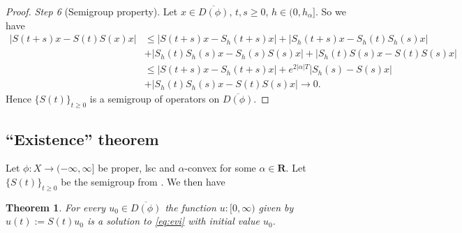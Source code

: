 \documentclass[a4paper,11pt, leqno]{scrreprt} %
\renewcommand{\leq}{\leqslant}
\renewcommand{\leq}{\leqslant}
\renewcommand{\geq}{\geqslant}
\newcommand{\R}{\mathbf R}
\theoremstyle{change}
\newcounter{acounter}[chapter]
\newtheorem{theorem}[acounter]{Theorem}
\theoremstyle{nonumberplain}
\newtheorem{proof}{Proof}
\begin{document}
\begin{proof}
  \textit{Step 6} (Semigroup property).
  Let $x \in \overline{D(\phi)}$, $t, s \geq 0$, $h \in (0,
  h_\alpha]$. So we have
  \begin{equation*}
    \begin{split}
      |S(t + s)x - S(t)S(x)x| &\leq |S(t + s)x - S_h(t + s)x| + |S_h(t
      + s)x - S_h(t)S_h(s)x|\\
      &+|S_h(t)S_h(s)x - S_h(s)S(s)x| + |S_h(t)S(s)x - S(t)S(s)x|\\
      &\leq |S(t + s)x - S_h(t + s)x| + e^{2 |\alpha| T}|S_h(s) -
      S(s)x|\\
      &+ |S_h(t)S_h(s)x - S(t)S(s)x| \to 0.
    \end{split}
  \end{equation*}
  Hence $\{S(t)\}_{t \geq 0}$ is a semigroup of operators on $\overline{D(\phi)}$.
\end{proof}

\subsection{``Existence'' theorem}

Let $\phi: X \to (-\infty, \infty]$ be proper, lsc and $\alpha$-convex
for some $\alpha \in \R$. Let $\{S(t)\}_{t \geq 0}$ be the semigroup
from . We then have

\begin{theorem}
  For every $u_0 \in \overline{D(\phi)}$ the function $u : [0, \infty)$
  given by $u(t) := S(t)u_0$ is a solution to \eqref{eq:evi} with initial value $u_0$.
\end{theorem}
\end{document}
